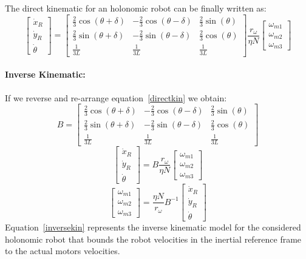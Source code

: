 The direct kinematic for an holonomic robot can be finally written as:
\begin{equation}
\begin{bmatrix}
\dot{x}_R\\
\dot{y}_R\\
\dot{\theta}
\end{bmatrix} =
\begin{bmatrix}
\frac{2}{3}\cos(\theta+\delta) & -\frac{2}{3}\cos(\theta-\delta) & \frac{2}{3}\sin(\theta)\\
\frac{2}{3}\sin(\theta+\delta) & -\frac{2}{3}\sin(\theta-\delta) & \frac{2}{3}\cos(\theta)\\
\frac{1}{3L} & \frac{1}{3L} & \frac{1}{3L}
\end{bmatrix}
\frac{r_\omega}{\eta N}
\begin{bmatrix}
\omega_{m1}\\
\omega_{m2}\\
\omega_{m3}
\end{bmatrix}
\label{directkin}
\end{equation}
\paragraph{Inverse Kinematic:} If we reverse and re-arrange equation~\ref{directkin} we obtain:
\begin{equation}
B = \begin{bmatrix}
\frac{2}{3}\cos(\theta+\delta) & -\frac{2}{3}\cos(\theta-\delta) & \frac{2}{3}\sin(\theta)\\
\frac{2}{3}\sin(\theta+\delta) & -\frac{2}{3}\sin(\theta-\delta) & \frac{2}{3}\cos(\theta)\\
\frac{1}{3L} & \frac{1}{3L} & \frac{1}{3L}
\end{bmatrix}
\end{equation}
\begin{equation}
\begin{bmatrix}
\dot{x}_R\\
\dot{y}_R\\
\dot{\theta}
\end{bmatrix} =
B
\frac{r_\omega}{\eta N}
\begin{bmatrix}
\omega_{m1}\\
\omega_{m2}\\
\omega_{m3}
\end{bmatrix}
\end{equation}
\begin{equation}
\begin{bmatrix}
\omega_{m1}\\
\omega_{m2}\\
\omega_{m3}
\end{bmatrix}=
\frac{\eta N}{r_\omega}B^{-1}
\begin{bmatrix}
\dot{x}_R\\
\dot{y}_R\\
\dot{\theta}
\end{bmatrix}
\label{inversekin}
\end{equation}
Equation~\ref{inversekin} represents the inverse kinematic model for the considered holonomic robot that bounds the robot velocities in the inertial reference frame to the actual motors velocities.
